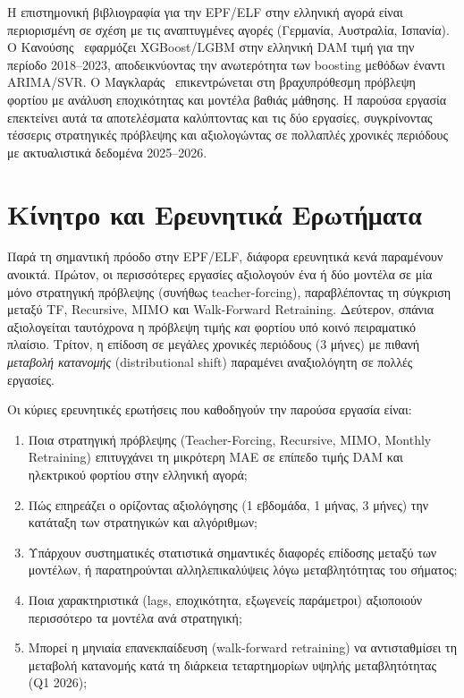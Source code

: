 Η επιστημονική βιβλιογραφία για την EPF/ELF στην ελληνική αγορά είναι περιορισμένη
σε σχέση με τις αναπτυγμένες αγορές (Γερμανία, Αυστραλία, Ισπανία). Ο
Κανούσης~\cite{kanousis2025} εφαρμόζει XGBoost/LGBM στην ελληνική DAM τιμή για
την περίοδο 2018--2023, αποδεικνύοντας την ανωτερότητα των boosting μεθόδων έναντι
ARIMA/SVR. Ο Μαγκλαράς~\cite{magklaras2022} επικεντρώνεται στη βραχυπρόθεσμη
πρόβλεψη φορτίου με ανάλυση εποχικότητας και μοντέλα βαθιάς μάθησης.
Η παρούσα εργασία επεκτείνει αυτά τα αποτελέσματα καλύπτοντας και τις δύο
εργασίες, συγκρίνοντας τέσσερις στρατηγικές πρόβλεψης και αξιολογώντας σε
πολλαπλές χρονικές περιόδους με ακτυαλιστικά δεδομένα 2025--2026.


\section{Κίνητρο και Ερευνητικά Ερωτήματα}
\label{sec:motivation}

Παρά τη σημαντική πρόοδο στην EPF/ELF, διάφορα ερευνητικά κενά παραμένουν
ανοικτά. Πρώτον, οι περισσότερες εργασίες αξιολογούν ένα ή δύο μοντέλα σε μία
μόνο στρατηγική πρόβλεψης (συνήθως teacher-forcing), παραβλέποντας τη σύγκριση
μεταξύ TF, Recursive, MIMO και Walk-Forward Retraining. Δεύτερον, σπάνια
αξιολογείται ταυτόχρονα η πρόβλεψη τιμής \textit{και} φορτίου υπό κοινό
πειραματικό πλαίσιο. Τρίτον, η επίδοση σε μεγάλες χρονικές περιόδους (3 μήνες)
με πιθανή \textit{μεταβολή κατανομής} (distributional shift) παραμένει
αναξιολόγητη σε πολλές εργασίες.

\medskip
Οι κύριες ερευνητικές ερωτήσεις που καθοδηγούν την παρούσα εργασία είναι:

\begin{enumerate}[label=\textbf{ΕΕ\arabic*.}]
    \item Ποια στρατηγική πρόβλεψης (Teacher-Forcing, Recursive, MIMO, Monthly
    Retraining) επιτυγχάνει τη μικρότερη MAE σε επίπεδο τιμής DAM και ηλεκτρικού
    φορτίου στην ελληνική αγορά;

    \item Πώς επηρεάζει ο ορίζοντας αξιολόγησης (1 εβδομάδα, 1 μήνας, 3 μήνες)
    την κατάταξη των στρατηγικών και αλγόριθμων;

    \item Υπάρχουν συστηματικές στατιστικά σημαντικές διαφορές επίδοσης μεταξύ των
    μοντέλων, ή παρατηρούνται αλληλεπικαλύψεις λόγω μεταβλητότητας του σήματος;

    \item Ποια χαρακτηριστικά (lags, εποχικότητα, εξωγενείς παράμετροι) αξιοποιούν
    περισσότερο τα μοντέλα ανά στρατηγική;

    \item Μπορεί η μηνιαία επανεκπαίδευση (walk-forward retraining) να αντισταθμίσει
    τη μεταβολή κατανομής κατά τη διάρκεια τεταρτημορίων υψηλής μεταβλητότητας
    (Q1 2026);
\end{enumerate}

